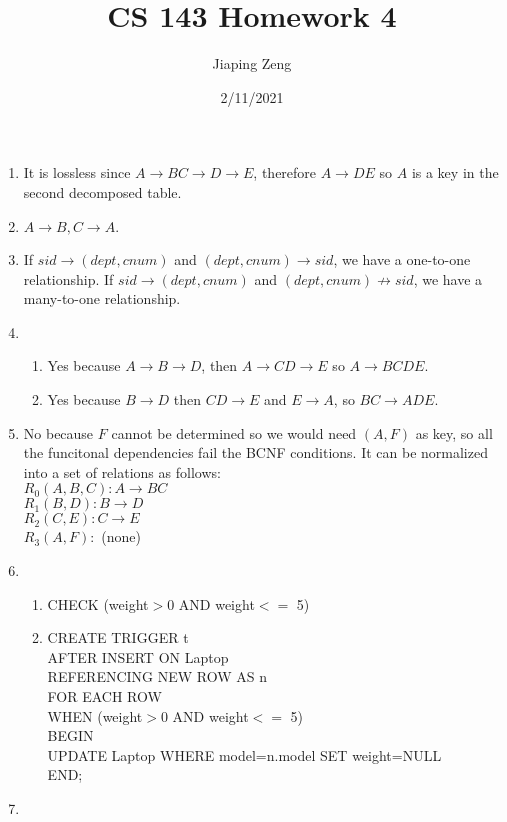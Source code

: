 \documentclass{article}
\title{CS 143 Homework 4}
\date{2/11/2021}
\author{Jiaping Zeng}
\begin{document}
\maketitle

\begin{enumerate}
    \item It is lossless since $A\rightarrow BC\rightarrow D\rightarrow E$, therefore $A\rightarrow DE$ so $A$ is a key in the second decomposed table.
    \item $A\rightarrow B,C\rightarrow A$.
    \item If $sid\rightarrow (dept,cnum)$ and $(dept,cnum)\rightarrow sid$, we have a one-to-one relationship. If $sid\rightarrow (dept,cnum)$ and $(dept,cnum)\not\rightarrow sid$, we have a many-to-one relationship.
    \item \begin{enumerate}
              \item Yes because $A\rightarrow B\rightarrow D$, then $A\rightarrow CD\rightarrow E$ so $A\rightarrow BCDE$.
              \item Yes because $B\rightarrow D$ then $CD\rightarrow E$ and $E\rightarrow A$, so $BC\rightarrow ADE$.
          \end{enumerate}
    \item No because $F$ cannot be determined so we would need $(A,F)$ as key, so all the funcitonal dependencies fail the BCNF conditions. It can be normalized into a set of relations as follows:\\$R_0(A,B,C): A\rightarrow BC$\\$R_1(B,D):B\rightarrow D$\\$R_2(C,E):C\rightarrow E$\\$R_3(A,F):$ (none)
    \item \begin{enumerate}
        \item CHECK (weight$>$0 AND weight$<=$ 5)
        \item CREATE TRIGGER t\\AFTER INSERT ON Laptop\\REFERENCING NEW ROW AS n\\FOR EACH ROW\\WHEN (weight$>$0 AND weight$<=$ 5)\\BEGIN\\UPDATE Laptop WHERE model=n.model SET weight=NULL\\END;
    \end{enumerate}
    \item \begin{enumerate}

\end{enumerate}
\end{enumerate}
\end{document}
